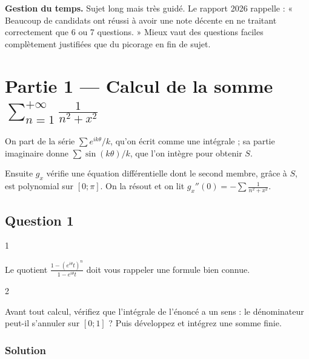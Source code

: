 \documentclass[11pt,a4paper]{article}
\begin{document}
\textbf{Gestion du temps.} Sujet long mais très guidé. Le rapport 2026 rappelle : « Beaucoup de candidats ont réussi à avoir une note décente en ne traitant correctement que 6 ou 7 questions. » Mieux vaut des questions faciles complètement justifiées que du picorage en fin de sujet.

\hypertarget{partie-1-calcul-de-la-somme-sum_n1inftyfrac1n2x2}{%
\section{\texorpdfstring{Partie 1 --- Calcul de la somme \(\sum_{n=1}^{+\infty}\frac{1}{n^2+x^2}\)}{Partie 1 --- Calcul de la somme \textbackslash sum\_\{n=1\}\^{}\{+\textbackslash infty\}\textbackslash frac\{1\}\{n\^{}2+x\^{}2\}}}\label{partie-1-calcul-de-la-somme-sum_n1inftyfrac1n2x2}}

On part de la série \(\sum e^{ik\theta}/k\), qu'on écrit comme une intégrale ; sa partie imaginaire donne \(\sum\sin(k\theta)/k\), que l'on intègre pour obtenir \(S\).

Ensuite \(g_x\) vérifie une équation différentielle dont le second membre, grâce à \(S\), est polynomial sur \([0;\pi]\). On la résout et on lit \(g_x''(0)=-\sum\frac{1}{n^2+x^2}\).

\hypertarget{question-1}{%
\subsection{Question 1}\label{question-1}}

\begin{indication}{1}

Le quotient \(\frac{1-(e^{i\theta}t)^n}{1-e^{i\theta}t}\) doit vous rappeler une formule bien connue.

\end{indication}

\begin{indication}{2}

Avant tout calcul, vérifiez que l'intégrale de l'énoncé a un sens : le dénominateur peut-il s'annuler sur \([0;1]\) ? Puis développez et intégrez une somme finie.

\end{indication}

\hypertarget{solution}{%
\subsubsection{Solution}\label{solution}}
\end{document}
